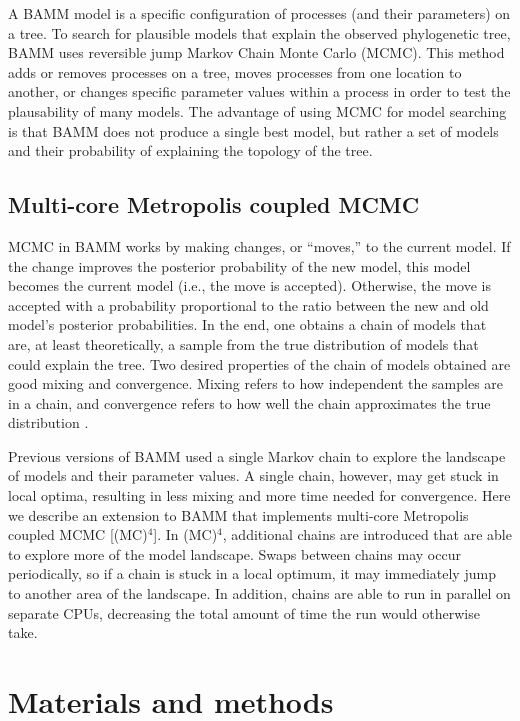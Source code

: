 \documentclass[12pt]{article}
\newcommand{\MCMCMCMC}{(MC)$^{4}$}
\begin{document}
A BAMM model is a specific configuration of processes
(and their parameters) on a tree.
%
To search for plausible models that explain the observed phylogenetic tree,
BAMM uses reversible jump Markov Chain Monte Carlo (MCMC).
%
This method adds or removes processes on a tree,
moves processes from one location to another,
or changes specific parameter values within a process
in order to test the plausability of many models.
%
The advantage of using MCMC for model searching
is that BAMM does not produce a single best model,
but rather a set of models and their probability
of explaining the topology of the tree.


\subsection*{Multi-core Metropolis coupled MCMC}

MCMC in BAMM works by making changes, or ``moves,'' to the current model.
%
If the change improves the posterior probability of the new model,
this model becomes the current model (i.e., the move is accepted).
%
Otherwise, the move is accepted with a probability proportional
to the ratio between the new and old model's posterior probabilities.
%
In the end, one obtains a chain of models that are, at least theoretically,
a sample from the true distribution of models that could explain the tree.
%
Two desired properties of the chain of models obtained
are good mixing and convergence.
%
Mixing refers to how independent the samples are in a chain,
and convergence refers to how well the chain
approximates the true distribution \citep{giv05}.


Previous versions of BAMM used a single Markov chain
to explore the landscape of models and their parameter values.
%
A single chain, however, may get stuck in local optima,
resulting in less mixing and more time needed for convergence.
%
Here we describe an extension to BAMM
that implements multi-core Metropolis coupled MCMC [\MCMCMCMC].
%
In \MCMCMCMC, additional chains are introduced
that are able to explore more of the model landscape.
%
Swaps between chains may occur periodically,
so if a chain is stuck in a local optimum,
it may immediately jump to another area of the landscape.
%
In addition, chains are able to run in parallel on separate CPUs,
decreasing the total amount of time the run would otherwise take.


\section*{Materials and methods}
\end{document}
